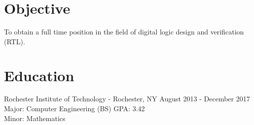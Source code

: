 \documentclass[a4paper,margin,line]{resume}
\newcommand{\rdate}[1]{\hfill {\small #1}}
\begin{document}
\begin{resume}
\section{\mysidestyle Objective}
    To obtain a full time position in the field of digital logic design and verification (RTL).


\section{\mysidestyle Education}
    \begin{compactdesc}
        \item[Rochester Institute of Technology] - Rochester, NY \rdate{August 2013 - December 2017} \\
            Major: Computer Engineering (BS) \rdate{GPA: 3.42}\\
            Minor: Mathematics \\
    \end{compactdesc}


\end{resume}
\end{document}
